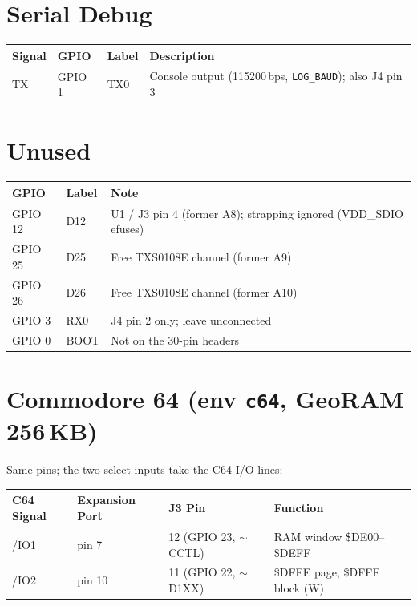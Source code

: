 \documentclass[a4paper,10pt]{article}
\begin{document}
\section{Serial Debug}
\begin{table}[H]
\centering
\begin{tabular}{@{}llll@{}}
\toprule
\textbf{Signal} & \textbf{GPIO} & \textbf{Label} & \textbf{Description} \\ \midrule
TX & GPIO 1 & TX0 & Console output (115200\,bps, \texttt{LOG\_BAUD}); also J4 pin 3 \\ \bottomrule
\end{tabular}
\end{table}

\section{Unused}
\begin{table}[H]
\centering
\begin{tabular}{@{}lll@{}}
\toprule
\textbf{GPIO} & \textbf{Label} & \textbf{Note} \\ \midrule
GPIO 12 & D12  & U1 / J3 pin 4 (former A8); strapping ignored (VDD\_SDIO efuses) \\
GPIO 25 & D25  & Free TXS0108E channel (former A9) \\
GPIO 26 & D26  & Free TXS0108E channel (former A10) \\
GPIO 3  & RX0  & J4 pin 2 only; leave unconnected \\
GPIO 0  & BOOT & Not on the 30-pin headers \\ \bottomrule
\end{tabular}
\end{table}

\section{Commodore 64 (env \texttt{c64}, GeoRAM 256\,KB)}
Same pins; the two select inputs take the C64 I/O lines:
\begin{table}[H]
\centering
\begin{tabular}{@{}llll@{}}
\toprule
\textbf{C64 Signal} & \textbf{Expansion Port} & \textbf{J3 Pin} & \textbf{Function} \\ \midrule
/IO1 & pin 7  & 12 (GPIO 23, $\sim$CCTL) & RAM window \$DE00--\$DEFF \\
/IO2 & pin 10 & 11 (GPIO 22, $\sim$D1XX) & \$DFFE page, \$DFFF block (W) \\ \bottomrule
\end{tabular}
\end{table}
\end{document}
